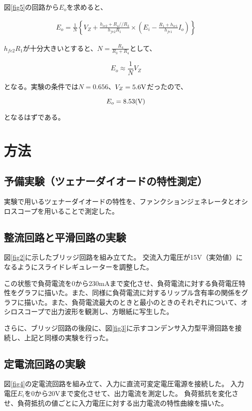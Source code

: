 \documentclass[11pt]{jsarticle}
\newcommand{\fr}[1]{図\ref{#1}}
\begin{document}
\fr{fig5}の回路から$E_o$を求めると、

\begin{eqnarray}
    E_o = \frac{1}{N} \left\{
            V_Z +
            \frac{h_{ie2} + R_4 // R_3}{h_{fe2}R_1} \times
            \left( E_i - \frac{R_1 + h_{ie1}}{h_{fe1}} I_o \right)
        \right\}
    \label{eq1}
\end{eqnarray}

$h_{fe2}R_1$が十分大きいとすると、$N=\frac{R_4}{R_3 + R_4}$として、

\[
    E_o \approx \frac{1}{N}V_Z
\]

となる。実験の条件では$N=0.656$、$V_Z = 5.6{\rm V}$だったので、

\[
    E_o = 8.53 ({\rm V})
\]

となるはずである。

\section{方法}
\subsection{予備実験（ツェナーダイオードの特性測定）}
実験で用いるツェナーダイオードの特性を、ファンクションジェネレータとオシロスコープを用いることで測定した。

\subsection{整流回路と平滑回路の実験}
\fr{fig2}に示したブリッジ回路を組み立てた。
交流入力電圧が15V（実効値）になるようにスライドレギュレーターを調整した。

この状態で負荷電流を0から230mAまで変化させ、負荷電流に対する負荷電圧特性をグラフに描いた。また、同様に負荷電流に対するリップル含有率の関係をグラフに描いた。また、負荷電流最大のときと最小のときのそれぞれについて、オシロスコープで出力波形を観測し、方眼紙に写生した。

さらに、ブリッジ回路の後段に、\fr{fig3}に示すコンデンサ入力型平滑回路を接続し、上記と同様の実験を行った。

\subsection{定電流回路の実験}
\fr{fig4}の定電流回路を組み立て、入力に直流可変定電圧電源を接続した。
入力電圧$E_i$を0から20Vまで変化させて、出力電流を測定した。
負荷抵抗を変化させ、負荷抵抗の値ごとに入力電圧に対する出力電流の特性曲線を描いた。
\end{document}

